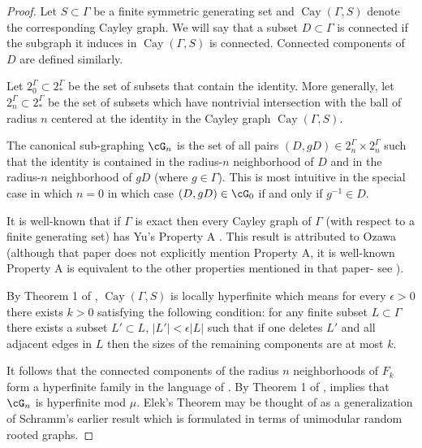\documentclass[12pt]{article}
\theoremstyle{plain}
\theoremstyle{definition}
\theoremstyle{remark}
\newcommand{\G}{\Gamma}
\newcommand{\eps}{\epsilon}
\newcommand{\Cay}{\operatorname{Cay}}
\begin{document}
\begin{proof}

Let $S \subset \G$ be a finite symmetric generating set and $\Cay(\G,S)$ denote the corresponding Cayley graph. We will say that a subset $D \subset \G$ is connected if the subgraph it induces in $\Cay(\G,S)$ is connected. Connected components of $D$ are defined similarly.

Let $2_0^\G \subset 2^\G_*$ be the set of subsets that contain the identity. More generally, let $2^\G_n \subset 2^\G_*$ be the set of subsets which have nontrivial intersection with the ball of radius $n$ centered at the identity in the Cayley graph $\Cay(\G,S)$. 


The canonical sub-graphing $\cG_n$ is the set of all pairs $(D,gD) \in 2^\G_n \times 2^\G_n$ such that the identity is contained in the radius-$n$ neighborhood of $D$ and in the radius-$n$ neighborhood of $gD$ (where $g\in \G$). This is most intuitive in the special case in which $n=0$ in which case $(D,gD)\in \cG_0$ if and only if $g^{-1}\in D$. 


It is well-known that if $\G$ is exact then every Cayley graph of $\G$ (with respect to a finite generating set) has Yu's Property A \cite{anantharaman-survey, MR1728880}. This result is attributed to Ozawa \cite{MR1763912} (although that paper does not explicitly mention Property A, it is well-known Property A is equivalent to the other properties mentioned in that paper- see \cite[Proposition 3.13]{anantharaman-survey}). 

By Theorem 1 of \cite{elek2023comprehensive}, $\Cay(\G,S)$ is locally hyperfinite which means for every $\eps>0$ there exists $k>0$ satisfying the following condition: for any finite subset $L \subset \G$ there exists a subset $L' \subset L$, $|L'| < \eps |L|$ such that if one deletes $L'$ and all adjacent edges in $L$ then the sizes of the remaining components are at most $k$.

It follows that the connected components of the radius $n$ neighborhoods of $F_k$ form a hyperfinite family in the language of \cite{MR2967301}. By Theorem 1 of \cite{MR2967301}, implies that $\cG_n$ is hyperfinite mod $\mu$. Elek's Theorem may be thought of as a generalization of Schramm's earlier result \cite{MR2372897} which is formulated in terms of unimodular random rooted graphs. 


\end{proof}
\end{document}
